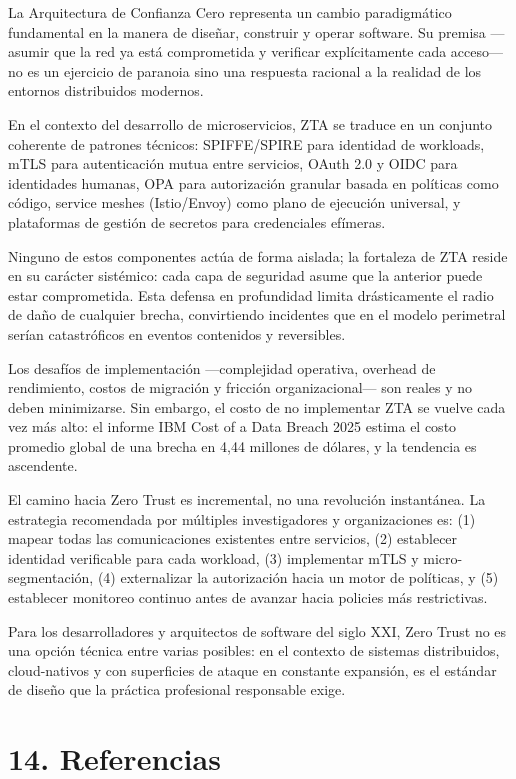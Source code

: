 \documentclass[12pt,a4paper]{article}
\begin{document}
La Arquitectura de Confianza Cero representa un cambio paradigmático fundamental en la manera de diseñar, construir y operar software. Su premisa —asumir que la red ya está comprometida y verificar explícitamente cada acceso— no es un ejercicio de paranoia sino una respuesta racional a la realidad de los entornos distribuidos modernos.

En el contexto del desarrollo de microservicios, ZTA se traduce en un conjunto coherente de patrones técnicos: SPIFFE/SPIRE para identidad de workloads, mTLS para autenticación mutua entre servicios, OAuth 2.0 y OIDC para identidades humanas, OPA para autorización granular basada en políticas como código, service meshes (Istio/Envoy) como plano de ejecución universal, y plataformas de gestión de secretos para credenciales efímeras.

Ninguno de estos componentes actúa de forma aislada; la fortaleza de ZTA reside en su carácter sistémico: cada capa de seguridad asume que la anterior puede estar comprometida. Esta defensa en profundidad limita drásticamente el radio de daño de cualquier brecha, convirtiendo incidentes que en el modelo perimetral serían catastróficos en eventos contenidos y reversibles.

Los desafíos de implementación —complejidad operativa, overhead de rendimiento, costos de migración y fricción organizacional— son reales y no deben minimizarse. Sin embargo, el costo de no implementar ZTA se vuelve cada vez más alto: el informe IBM Cost of a Data Breach 2025 estima el costo promedio global de una brecha en 4,44 millones de dólares, y la tendencia es ascendente.

El camino hacia Zero Trust es incremental, no una revolución instantánea. La estrategia recomendada por múltiples investigadores y organizaciones es: (1) mapear todas las comunicaciones existentes entre servicios, (2) establecer identidad verificable para cada workload, (3) implementar mTLS y micro-segmentación, (4) externalizar la autorización hacia un motor de políticas, y (5) establecer monitoreo continuo antes de avanzar hacia policies más restrictivas.

Para los desarrolladores y arquitectos de software del siglo XXI, Zero Trust no es una opción técnica entre varias posibles: en el contexto de sistemas distribuidos, cloud-nativos y con superficies de ataque en constante expansión, es el estándar de diseño que la práctica profesional responsable exige.



\section{14. Referencias}
\end{document}
